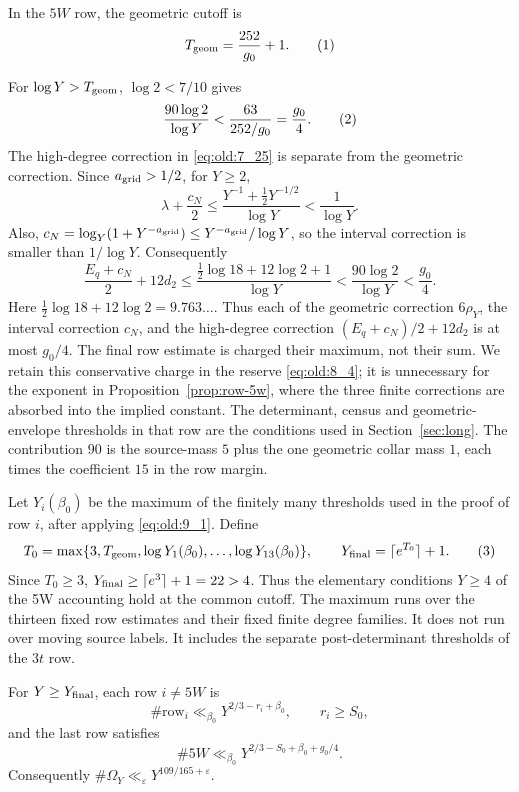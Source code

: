 \begin{samepage}
In the \(5W\) row, the geometric cutoff is
\[
T_{\rm geom}=\frac{252}{g_0}+1.
\AutoTag{eq:old:9_3}
\]
\end{samepage}%
For \(\log Y>T_{\rm geom}\), \(\log2<7/10\) gives
\[
\frac{90\log2}{\log Y}
<\frac{63}{252/g_0}=\frac{g_0}{4}.
\AutoTag{eq:old:9_4}
\]
The high-degree correction in \eqref{eq:old:7_25} is separate from the geometric
correction. Since \(a_{\rm grid}>1/2\), for \(Y\ge2\),
\[
\lambda+\frac{c_N}{2}
\le \frac{Y^{-1}+\tfrac12Y^{-1/2}}{\log Y}
<\frac1{\log Y}.
\]
Also, \(c_N=\log_Y(1+Y^{-a_{\rm grid}})
\le Y^{-a_{\rm grid}}/\log Y\), so the interval correction is smaller
than \(1/\log Y\).
Consequently
\[
\frac{E_q+c_N}{2}+12d_2
\le\frac{\tfrac12\log18+12\log2+1}{\log Y}
<\frac{90\log2}{\log Y}<\frac{g_0}{4}.
\]
Here \(\tfrac12\log18+12\log2=9.763\ldots\). Thus each of the geometric
correction \(6\rho_Y\), the interval correction \(c_N\), and the high-degree
correction \((E_q+c_N)/2+12d_2\) is at most \(g_0/4\). The final row estimate
is charged their maximum, not their sum.
We retain this conservative charge in the reserve \eqref{eq:old:8_4};
it is unnecessary for the exponent in Proposition~\ref{prop:row-5w},
where the three finite corrections are absorbed into the implied constant.
The determinant, census and geometric-envelope thresholds in that row
are the conditions used in Section~\ref{sec:long}. The
contribution \(90\) is the source-mass \(5\) plus the one geometric
collar mass \(1\), each times the coefficient \(15\) in the
row margin.

Let \(Y_i(\beta_0)\) be the maximum of the finitely many thresholds
used in the proof of row \(i\), after applying \eqref{eq:old:9_1}.
Define
\[
T_0=\max\{3,T_{\rm geom},\log Y_1(\beta_0),\ldots,
                         \log Y_{13}(\beta_0)\},\qquad
Y_{\rm final}=\lceil e^{T_0}\rceil+1.
\AutoTag{eq:old:9_5}
\]
Since \(T_0\ge3\), \(Y_{\rm final}\ge\lceil e^3\rceil+1=22>4\).
Thus the elementary conditions \(Y\ge4\) of the 5W accounting
hold at the common cutoff.
The maximum runs over the thirteen fixed row estimates and their fixed
finite degree families. It does not run over moving source labels. It
includes the separate post-determinant thresholds of the \(3t\) row.

\begin{proposition}\label{prop:commonloss}
For \(Y\ge Y_{\rm final}\), each row \(i\ne5W\) is
\[
\#\mathrm{row}_i\ll_{\beta_0}
Y^{2/3-r_i+\beta_0},
\qquad r_i\ge S_0,
\]
and the last row satisfies
\[
\#5W\ll_{\beta_0}
Y^{2/3-S_0+\beta_0+g_0/4}.
\]
Consequently \(\#\Omega_Y\ll_\varepsilon
Y^{109/165+\varepsilon}\).
\end{proposition}

